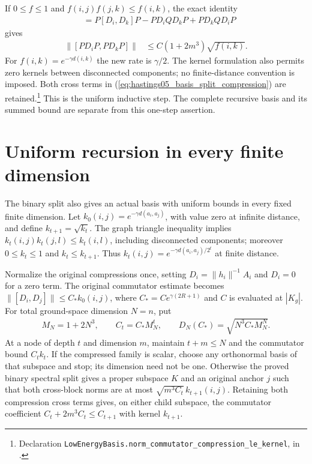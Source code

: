\documentclass{article}
\providecommand{\leanid}[1]{\nolinkurl{#1}}
\begin{document}
If $0\le f\le1$ and $f(i,j)f(j,k)\le f(i,k)$, the exact identity
\begin{align}
 [PD_iP,PD_kP]
 &=P[D_i,D_k]P-PD_iQD_kP+PD_kQD_iP
 \label{eq:hastings05_basis_split_compression}
\end{align}
gives
\begin{align}
 \|[PD_iP,PD_kP]\|
 &\le C(1+2m^3)\sqrt{f(i,k)}.
 \label{eq:hastings05_basis_split_child}
\end{align}
For $f(i,k)=e^{-\gamma d(i,k)}$ the new rate is $\gamma/2$.
The kernel formulation also permits zero kernels between disconnected
components; no finite-distance convention is imposed. Both cross terms in
(\ref{eq:hastings05_basis_split_compression}) are retained.\footnote{Declaration
\leanid{LowEnergyBasis.norm_commutator_compression_le_kernel}, in
.}
This is the uniform inductive step. The complete recursive basis and its
summed bound are separate from this one-step assertion.

\section{Uniform recursion in every finite dimension}

The binary split also gives an actual basis with uniform bounds in every fixed
finite dimension. Let $k_0(i,j)=e^{-\gamma d(a_i,a_j)}$, with value zero at
infinite distance, and define $k_{t+1}=\sqrt{k_t}$. The graph triangle inequality
implies $k_t(i,j)k_t(j,l)\le k_t(i,l)$, including disconnected components;
moreover $0\le k_t\le1$ and $k_t\le k_{t+1}$.
Thus $k_t(i,j)=e^{-\gamma d(a_i,a_j)/2^t}$ at finite distance.

Normalize the original compressions once, setting $D_i=\|h_i\|^{-1}A_i$ and
$D_i=0$ for a zero term. The original commutator estimate becomes
$\|[D_i,D_j]\|\le C_*k_0(i,j)$, where
$C_*=Ce^{\gamma(2R+1)}$ and $C$ is evaluated at $|K_g|$.
For total ground-space dimension $N=n$, put
\begin{align}
 M_N=1+2N^3,\qquad C_t=C_*M_N^t,\qquad
 D_N(C_*)=\sqrt{N^3C_*M_N^N}.
 \label{eq:hastings05_basis_recursive_coeff}
\end{align}
At a node of depth $t$ and dimension $m$, maintain $t+m\le N$ and the
commutator bound $C_tk_t$. If the compressed family is scalar, choose any
orthonormal basis of that subspace and stop; its dimension need not be one.
Otherwise the proved binary spectral split gives a proper subspace $K$ and an
original anchor $j$ such that both cross-block norms are at most
$\sqrt{m^3C_t}\,k_{t+1}(i,j)$. Retaining both compression cross terms gives,
on either child subspace, the commutator coefficient
$C_t+2m^3C_t\le C_{t+1}$ with kernel $k_{t+1}$.
\end{document}
